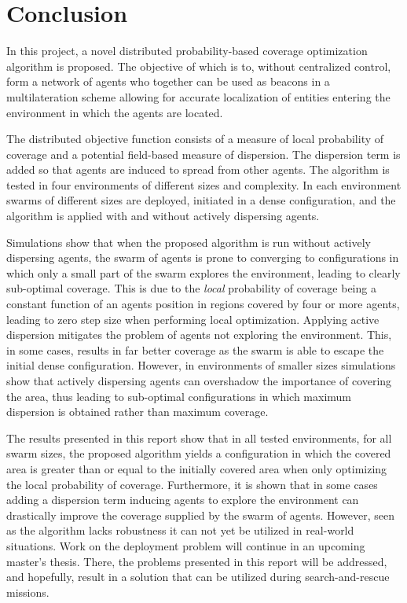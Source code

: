\section{Conclusion}
In this project, a novel distributed probability-based coverage optimization algorithm is proposed. The objective of which
is to, without centralized control, form a network of agents who together can be used as beacons in a 
multilateration scheme allowing for accurate localization of entities entering the environment in which the agents are located.

The distributed objective function consists of a measure of local probability of coverage and a potential field-based measure
of dispersion. The dispersion term is added so that agents are induced to spread from other agents.
The algorithm is tested in four environments of different sizes and complexity. In each environment swarms of different sizes
are deployed, initiated in a dense configuration, and the algorithm is applied with and without actively dispersing agents.

Simulations show that when the proposed algorithm is run without actively dispersing agents, the swarm of agents
is prone to converging to configurations in which only a small part of the swarm explores the environment, leading to 
clearly sub-optimal coverage. 
This is due to the \textit{local} probability of coverage being a constant function of an agents position in regions covered by four or more agents, 
leading to zero step size when performing local optimization.
Applying active dispersion mitigates the problem of agents not exploring the environment. This, in some cases, results in far better 
coverage as the swarm is able to escape the initial dense configuration.
However, in environments of smaller sizes simulations show that actively dispersing agents can overshadow the importance of covering the area, thus 
leading to sub-optimal configurations in which maximum dispersion is obtained rather than maximum coverage.

The results presented in this report show that in all tested environments, for all swarm sizes, the proposed algorithm yields
a configuration in which the covered area is greater than or equal to the initially covered area when only optimizing the local probability of coverage. 
Furthermore, it is shown that in some cases adding a dispersion term inducing agents to explore the environment can drastically improve the coverage supplied
by the swarm of agents. However, seen as the algorithm lacks robustness it can not yet be utilized in real-world situations. Work on the deployment problem
will continue in an upcoming master's thesis. There, the problems presented in this report will be addressed, and hopefully, result in a solution that can
be utilized during search-and-rescue missions.